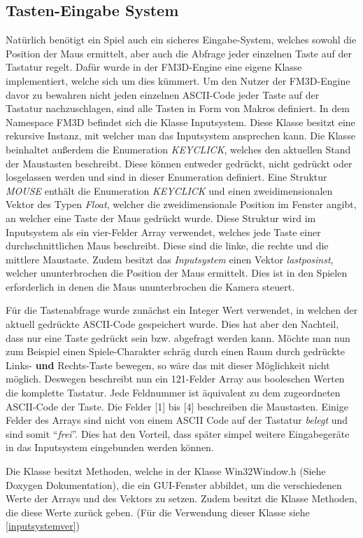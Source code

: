 \subsection{Tasten-Eingabe System}
Natürlich benötigt ein Spiel auch ein sicheres Eingabe-System, welches sowohl die Position der Maus ermittelt, aber auch die Abfrage jeder einzelnen Taste auf der Tastatur regelt. 
Dafür wurde in der FM3D-Engine eine eigene Klasse implementiert, welche sich um dies kümmert.
Um den Nutzer der FM3D-Engine davor zu bewahren nicht jeden einzelnen ASCII-Code jeder Taste auf der Tastatur nachzuschlagen, sind alle Tasten in Form von Makros definiert. 
In dem Namespace FM3D befindet sich die Klasse Inputsystem. Diese Klasse besitzt eine rekursive Instanz, mit welcher man das Inputsystem ansprechen kann. 
Die Klasse beinhaltet außerdem die Enumeration \textit{KEYCLICK}, welches den aktuellen Stand der Maustasten beschreibt. Diese können entweder gedrückt, nicht gedrückt oder losgelassen werden und sind in dieser Enumeration definiert.
Eine Struktur \textit{MOUSE} enthält die Enumeration \textit{KEYCLICK} und einen zweidimensionalen Vektor des Typen \textit{Float}, welcher die zweidimensionale Position im Fenster angibt, an welcher eine Taste der Maus gedrückt wurde.
Diese Struktur wird im Inputsystem als ein vier-Felder Array verwendet, welches jede Taste einer durchschnittlichen Maus beschreibt. Diese sind die linke, die rechte und die mittlere Maustaste. 
Zudem besitzt das \textit{Inputsystem} einen Vektor \textit{lastposinst}, welcher ununterbrochen die Position der Maus ermittelt. Dies ist in den Spielen erforderlich in denen die Maus ununterbrochen die Kamera steuert.

Für die Tastenabfrage wurde zunächst ein Integer Wert verwendet, in welchen der aktuell gedrückte ASCII-Code gespeichert wurde. Dies hat aber den Nachteil, dass nur eine Taste gedrückt sein bzw. abgefragt werden kann. Möchte man nun zum Beispiel einen Spiele-Charakter schräg durch einen Raum durch gedrückte Links- \textbf{und} Rechts-Taste bewegen, so wäre das mit dieser Möglichkeit nicht möglich. Deswegen beschreibt nun ein 121-Felder Array aus booleschen Werten die komplette Tastatur. Jede Feldnummer ist äquivalent zu dem zugeordneten ASCII-Code der Taste. Die Felder [1] bis [4] beschreiben die Maustasten. Einige Felder des Arrays sind nicht von einem ASCII Code auf der Tastatur \textit{belegt} und sind somit "`\textit{frei}"'. Dies hat den Vorteil, dass später simpel weitere Eingabegeräte in das Inputsystem eingebunden werden können.

Die Klasse besitzt Methoden, welche in der Klasse Win32Window.h (Siehe Doxygen Dokumentation), die ein GUI-Fenster abbildet, um die verschiedenen Werte der Arrays und des Vektors zu setzen.
Zudem besitzt die Klasse Methoden, die diese Werte zurück geben. (Für die Verwendung dieser Klasse siehe \cref{inputsystemver})
